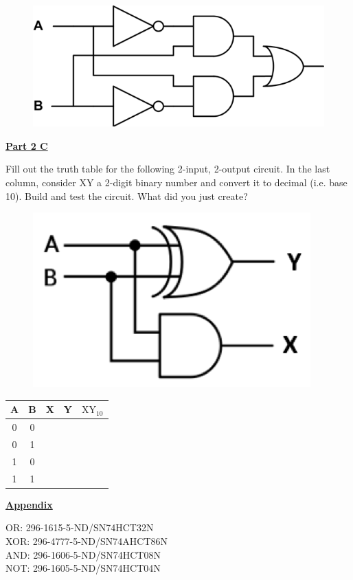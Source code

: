 \begin{figure}[H]
\includegraphics[scale=0.85]{figures/logic-circuits/fig5.png}
\end{figure}

\underline{\textbf{Part 2 C}} \par

Fill out the truth table for the following 2-input, 2-output circuit.
In the last column, consider XY a 2-digit binary number and convert it to decimal (i.e. base 10).
Build and test the circuit.
What did you just create?

\begin{figure}[H]
\includegraphics[scale=0.80]{figures/logic-circuits/fig6.png}
\end{figure}

\begin{tabular}[H]{ | c | c | c | c | c | }
\hline
A & B & X & Y & $\text{XY}_{10}$ \\
\hline
0 & 0 & \  & \  & \  \\
\hline
0 & 1 & \  & \  & \  \\
\hline
1 & 0 & \  & \  & \  \\
\hline
1 & 1 & \  & \  & \  \\
\hline
\end{tabular}

\vspace{\baselineskip}

\underline{\textbf{Appendix}} \par

\vspace{\baselineskip}

OR: 296-1615-5-ND/SN74HCT32N \\
XOR: 296-4777-5-ND/SN74AHCT86N \\
AND: 296-1606-5-ND/SN74HCT08N \\
NOT: 296-1605-5-ND/SN74HCT04N

\pagebreak \clearpage
